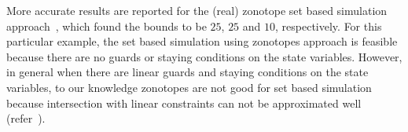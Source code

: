 More accurate results are reported for the (real) zonotope set based
simulation approach~\cite{TODO}, which found the bounds to be $25$,
$25$ and $10$, respectively.  For this particular example, the set
based simulation using zonotopes approach is feasible because there
are no guards or staying conditions on the state variables.  However,
in general when there are linear guards and staying conditions on the
state variables, to our knowledge zonotopes are not good for set based
simulation because intersection with linear constraints can not be
approximated well (refer~\cite{TODO}).

